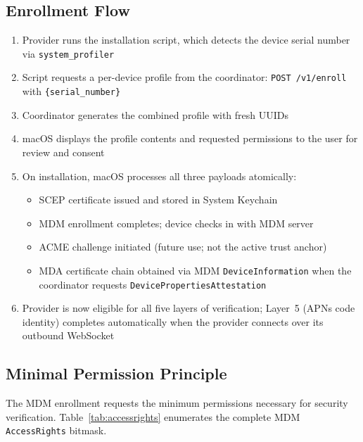 \documentclass[10pt,twocolumn,letterpaper]{article}
\begin{document}
\subsection{Enrollment Flow}

\begin{enumerate}[leftmargin=*,itemsep=1pt]
    \item Provider runs the installation script, which detects the device serial number via \texttt{system\_profiler}
    \item Script requests a per-device profile from the coordinator: \texttt{POST /v1/enroll} with \texttt{\{serial\_number\}}
    \item Coordinator generates the combined profile with fresh UUIDs
    \item macOS displays the profile contents and requested permissions to the user for review and consent
    \item On installation, macOS processes all three payloads atomically:
    \begin{itemize}[leftmargin=*,itemsep=0pt]
        \item SCEP certificate issued and stored in System Keychain
        \item MDM enrollment completes; device checks in with MDM server
        \item ACME challenge initiated (future use; not the active trust anchor)
        \item MDA certificate chain obtained via MDM \texttt{DeviceInformation} when the coordinator requests \texttt{DevicePropertiesAttestation}
    \end{itemize}
    \item Provider is now eligible for all five layers of verification; Layer~5 (APNs code identity) completes automatically when the provider connects over its outbound WebSocket
\end{enumerate}

\subsection{Minimal Permission Principle}

The MDM enrollment requests the minimum permissions necessary for security verification. Table~\ref{tab:accessrights} enumerates the complete MDM \texttt{AccessRights} bitmask.
\end{document}
